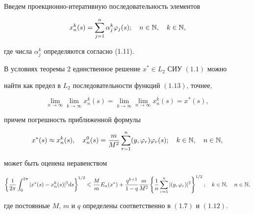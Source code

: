 Введем проекционно-итеративную последовательность элементов


\begin{equation}


x^k_n(s)=\sum\limits^n_{j=1}\alpha^k_j\varphi_j(s); \quad n\in \N, \quad


k\in \N,


\end{equation}


где числа $\alpha^k_j$ определяются согласно (1.11).








\begin{thm}


В условиях теоремы $2$ единственное решение $x^*\in L_2$ СИУ $(1.1)$ можно


найти как предел в $L_2$ последовательности функций $(1.13)$, точнее,


$$


\lim\limits_{n\rightarrow\infty}\lim\limits_{k\rightarrow\infty}x^k_n(s)=


\lim\limits_{k\rightarrow\infty}\lim\limits_{n


\rightarrow\infty}x^k_n(s)=x^*(s),


$$


причем погрешность приближенной формулы


$$


x^*(s)\approx x^k_n(s),\quad


x^0_n(s)=\frac{m}{M^2}\sum\limits^{n}_{r=1}(y,\varphi_r)\varphi_r(s);


\quad k\in \N, \quad n\in \N,


$$


может быть оценена неравенством


$$


\left\{\frac{1}{2\pi}\int^{2\pi}_0|x^*(s)-


x^k_n(s)|^2ds\right\}^{1/2}\lea 


%


\frac{M}{m}E_n(x^*)+\frac{q^{k+1}}{1-q}\frac{m}{M^2}


\left\{\frac{1}{n}\sum\limits^n_{r=1}|(y,\varphi_r)|^2\right\}^{1/2};


\quad k\in \N, \quad n\in \N,


$$


где постоянные $M$, $m$ и $q$ определены соответственно в $(1.7)$ и $(1.12)$.


\end{thm}






